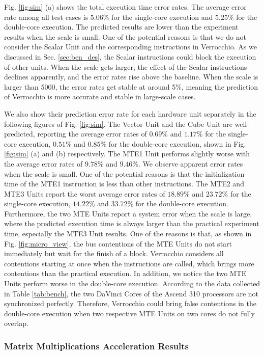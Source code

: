 Fig. \ref{fig:sim} (a) shows the total execution time error rates. The average error rate among all test cases is $5.06\%$ for the single-core execution and $5.25\%$ for the double-core execution. The predicted results are lower than the experiment results when the scale is small. One of the potential reasons is that we do not consider the Scalar Unit and the corresponding instructions in Verrocchio. As we discussed in Sec. \ref{sec:ben_des}, the Scalar instructions could block the execution of other units. When the scale gets larger, the effect of the Scalar instructions declines apparently, and the error rates rise above the baseline. When the scale is larger than 5000, the error rates get stable at around 5\%, meaning the prediction of Verrocchio is more accurate and stable in large-scale cases. 

We also show their prediction error rate for each hardware unit separately in the following figures of Fig. \ref{fig:sim}. The Vector Unit and the Cube Unit are well-predicted, reporting the average error rates of $0.69\%$ and $1.17\%$ for the single-core execution, $0.51\%$ and $0.85\%$ for the double-core execution, shown in Fig. \ref{fig:sim} (a) and (b) respectively. The MTE1 Unit performs slightly worse with the average error rates of $9.78\%$ and $9.46\%$. We observe apparent error rates when the scale is small. One of the potential reasons is that the initialization time of the MTE1 instruction is less than other instructions. The MTE2 and MTE3 Units report the worst average error rates of $18.89\%$ and $23.72\%$ for the single-core execution, $14.22\%$ and $33.72\%$ for the double-core execution. Furthermore, the two MTE Units report a system error when the scale is large, where the predicted execution time is always larger than the practical experiment time, especially the MTE3 Unit results. One of the reasons is that, as shown in Fig. \ref{fig:micro_view}, the bus contentions of the MTE Units do not start immediately but wait for the finish of a block. Verrocchio considers all contentions starting at once when the instructions are called, which brings more contentions than the practical execution. In addition, we notice the two MTE Units perform worse in the double-core execution. According to the data collected in Table \ref{tab:bench}, the two DaVinci Cores of the Ascend 310 processors are not synchronized perfectly. Therefore, Verrocchio could bring false contentions in the double-core execution when two respective MTE Units on two cores do not fully overlap.

\subsubsection{Matrix Multiplications Acceleration Results}


